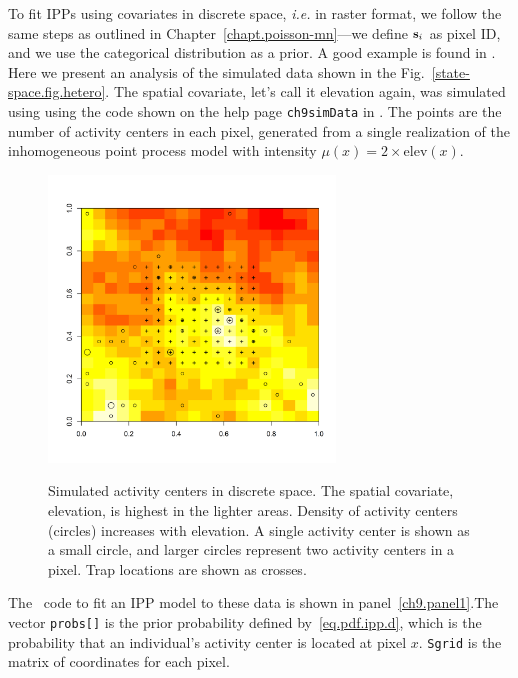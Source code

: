 To fit IPPs using covariates in discrete space, \emph{i.e.} in raster
format, we follow the same steps
as outlined in Chapter~\ref{chapt.poisson-mn}---we define ${\bf s}_i$ as
pixel ID, and we use the categorical distribution as a prior. A good
example is found in \citep{mollet_etal:2012}. Here we present
an analysis of the simulated data shown in the %
Fig.~\ref{state-space.fig.hetero}. The spatial covariate, let's call it
elevation again, was simulated
using using the code shown on the help page
\verb+ch9simData+ in \scrbook. The points are the number of
activity centers in each pixel, generated from a single realization of
the inhomogeneous point process model with intensity
$\mu(x) = 2 \times \mbox{elev}(x)$.
\begin{figure}[ht]
\centering
\includegraphics[width=3in,height=3in]{Ch11/figs/discrete}
\label{ch9.fig.discrete}
\caption{Simulated activity centers in discrete space. The spatial
  covariate, elevation, is highest in the lighter areas. Density of
  activity centers (circles) increases with elevation. A single
  activity center is shown as a small circle, and larger circles
  represent two activity centers in a pixel. Trap locations
  are shown as crosses.}
\end{figure}

The \bugs~code to fit an IPP model to these data is shown in
panel~\ref{ch9.panel1}.The vector \verb+probs[]+ is the prior
probability defined
by~\ref{eq.pdf.ipp.d}, which is the probability that an individual's
activity center is located at pixel $x$. \verb+Sgrid+ is the
matrix of coordinates for each pixel.

